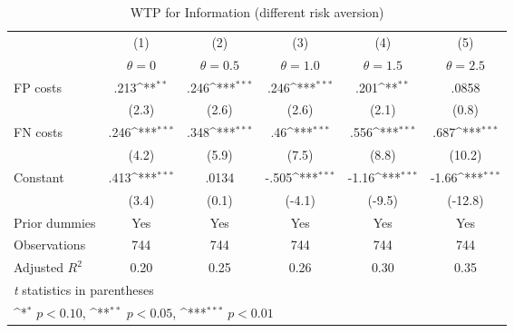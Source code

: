 \begin{table}[htbp]\centering
\def\sym#1{\ifmmode^{#1}\else\(^{#1}\)\fi}
\caption{WTP for Information (different risk aversion)}
\begin{tabular}{l*{5}{c}}
\hline\hline
                &\multicolumn{1}{c}{(1)}&\multicolumn{1}{c}{(2)}&\multicolumn{1}{c}{(3)}&\multicolumn{1}{c}{(4)}&\multicolumn{1}{c}{(5)}\\
                &\multicolumn{1}{c}{$\theta=0$}&\multicolumn{1}{c}{$\theta=0.5$}&\multicolumn{1}{c}{$\theta=1.0$}&\multicolumn{1}{c}{$\theta=1.5$}&\multicolumn{1}{c}{$\theta=2.5$}\\
\hline
FP costs        &     .213\sym{**} &     .246\sym{***}&     .246\sym{***}&     .201\sym{**} &    .0858         \\
                &    (2.3)         &    (2.6)         &    (2.6)         &    (2.1)         &    (0.8)         \\
FN costs        &     .246\sym{***}&     .348\sym{***}&      .46\sym{***}&     .556\sym{***}&     .687\sym{***}\\
                &    (4.2)         &    (5.9)         &    (7.5)         &    (8.8)         &   (10.2)         \\
Constant        &     .413\sym{***}&    .0134         &    -.505\sym{***}&    -1.16\sym{***}&    -1.66\sym{***}\\
                &    (3.4)         &    (0.1)         &   (-4.1)         &   (-9.5)         &  (-12.8)         \\
Prior dummies   &      Yes         &      Yes         &      Yes         &      Yes         &      Yes         \\
\hline
Observations    &      744         &      744         &      744         &      744         &      744         \\
Adjusted \(R^{2}\)&     0.20         &     0.25         &     0.26         &     0.30         &     0.35         \\
\hline\hline
\multicolumn{6}{l}{\footnotesize \textit{t} statistics in parentheses}\\
\multicolumn{6}{l}{\footnotesize \sym{*} \(p<0.10\), \sym{**} \(p<0.05\), \sym{***} \(p<0.01\)}\\
\end{tabular}
\end{table}
